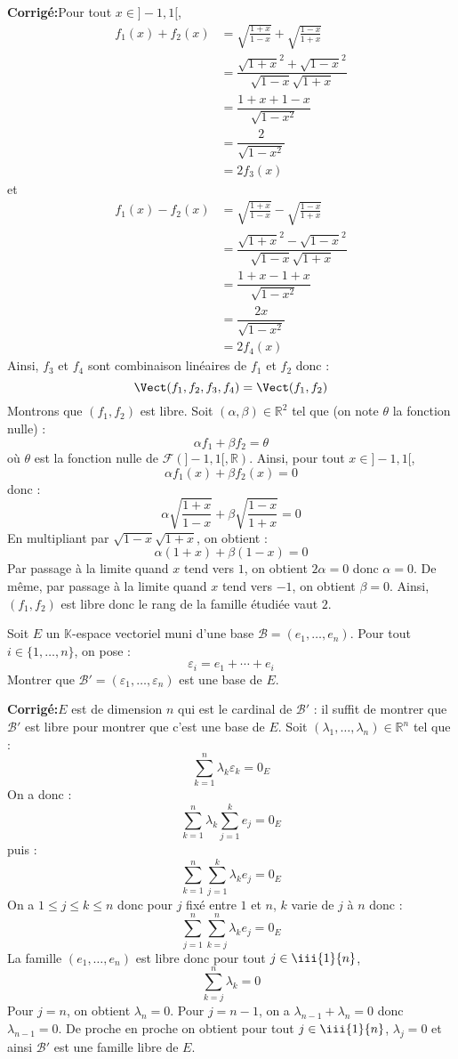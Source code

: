 \documentclass[a4paper,twoside,french,10pt]{VcCours}
\newcommand{\corr}{\textbf{Corrigé:}}
\begin{document}
\corr Pour tout $x \in ]-1,1[$,
\begin{align*}
 f_1(x)+f_2(x) & = \sqrt {\frac{1 + x}{1 - x}} + \sqrt {\frac{1 - x}{1 + x}}  \\
 & = \dfrac{\sqrt{1+x}^2 + \sqrt{1-x}^2}{\sqrt{1-x}\sqrt{1+x}} \\
 & = \dfrac{1+x+1-x}{\sqrt{1-x^2}}\\
 & = \dfrac{2}{\sqrt{1-x^2}}\\
 & = 2 f_3(x)
 \end{align*}
et 
\begin{align*}
 f_1(x)-f_2(x) & = \sqrt {\frac{1 + x}{1 - x}} - \sqrt {\frac{1 - x}{1 + x}}  \\
 & = \dfrac{\sqrt{1+x}^2 - \sqrt{1-x}^2}{\sqrt{1-x}\sqrt{1+x}} \\
 & = \dfrac{1+x-1+x}{\sqrt{1-x^2}}\\
 & = \dfrac{2x}{\sqrt{1-x^2}}\\
 & = 2 f_4(x)
 \end{align*}
 Ainsi, $f_3$ et $f_4$ sont combinaison linéaires de $f_1$ et $f_2$ donc :
 $$ \Vect(f_1,f_2,f_3,f_4) = \Vect(f_1,f_2)$$
Montrons que $(f_1,f_2)$ est libre. Soit $(\alpha, \beta) \in \mathbb{R}^2$ tel que (on note $\theta$ la fonction nulle) :
$$ \alpha f_1 + \beta f_2 = \theta$$
où $\theta$ est la fonction nulle de $\mathcal{F}(]-1,1[, \mathbb{R})$. Ainsi, pour tout $x \in ]-1,1[$,
$$ \alpha f_1(x)+ \beta f_2(x) = 0$$
donc :
$$ \alpha \sqrt {\frac{1 + x}{1 - x}} +  \beta \sqrt {\frac{1 - x}{1 + x}} = 0$$
En multipliant par $\sqrt{1-x} \sqrt{1+x}$, on obtient :
$$ \alpha (1+x) + \beta (1-x) = 0$$
Par passage à la limite quand $x$ tend vers $1$, on obtient $2\alpha=0$ donc $\alpha=0$. De même, par passage à la limite quand $x$ tend vers $-1$, on obtient $\beta=0$. Ainsi, $(f_1,f_2)$ est libre donc le rang de la famille étudiée vaut $2$.

\medskip

\begin{Exercice}{} Soit $E$ un $\mathbb{K}$-espace vectoriel muni d'une base $\mathcal{B} = (e_1 , \ldots ,e_n)$. Pour tout $i \in \lbrace 1, \ldots ,n \rbrace$, on pose :
$$\varepsilon_i = e_1 + \cdots + e_i$$
Montrer que $\mathcal{B}' = (\varepsilon_1 , \ldots ,\varepsilon_n)$ est une base de $E$.
\end{Exercice} 

\corr $E$ est de dimension $n$ qui est le cardinal de $\mathcal{B}'$ : il suffit de montrer que $\mathcal{B}'$ est libre pour montrer que c'est une base de $E$. Soit $(\lambda_1, \ldots, \lambda_n) \in \mathbb{R}^n$ tel que :
$$ \sum_{k=1}^n \lambda_k \varepsilon_k = 0_E$$
On a donc :
$$ \sum_{k=1}^n \lambda_k  \sum_{j=1}^k e_j = 0_E$$
puis : 
$$ \sum_{k=1}^n   \sum_{j=1}^k \lambda_k e_j = 0_E$$
On a $1 \leq j \leq k \leq n$ donc pour $j$ fixé entre $1$ et $n$, $k$ varie de $j$ à $n$ donc :
$$ \sum_{j=1}^n   \sum_{k=j}^n \lambda_k e_j = 0_E$$
La famille $(e_1, \ldots, e_n)$ est libre donc pour tout $j \in \iii{1}{n}$,
$$ \sum_{k=j}^n \lambda_k = 0$$
Pour $j=n$, on obtient $\lambda_n=0$. Pour $j=n-1$, on a $\lambda_{n-1}+\lambda_n=0$ donc $\lambda_{n-1}=0$. De proche en proche on obtient pour tout $j \in \iii{1}{n}$, $\lambda_j=0$ et ainsi $\mathcal{B}'$ est une famille libre de $E$.
\end{document}
